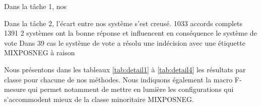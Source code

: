 \label{sec:resultats}

Dans la tâche 1, nos




Dans la tâche 2, l'écart entre nos système s'est creusé.
1033 accords complets
1391 2 systèmes ont la bonne réponse et influencent en conséquence le système de vote
Dans 39 cas le système de vote a résolu une indécision avec une étiquette MIXPOSNEG à raison





Nous présentons dans les tableaux \ref{tab:detail1} à \ref{tab:detail4} les résultats par classe pour chacune de nos méthodes.
 Nous indiquons également la macro F-mesure qui permet notamment de mettre en lumière les configurations qui s'accommodent mieux de la classe minoritaire MIXPOSNEG.
